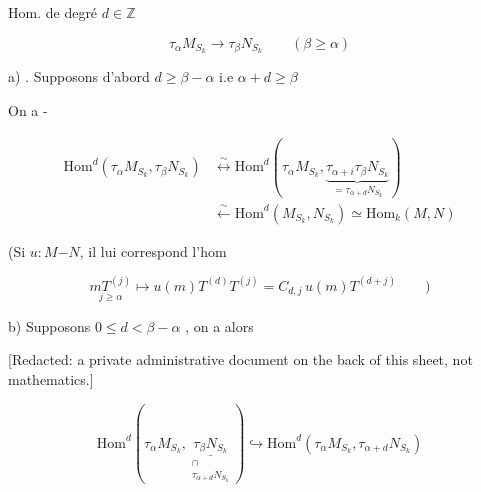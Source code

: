 Hom.  de degré $d\in\mathbb{Z}$

\[
\tau_\alpha M_{S_k}\longrightarrow\tau_\beta N_{S_k}\qquad(\beta\geq\alpha)
\]

a) . Supposons d'abord $\boxed{d\geq\beta-\alpha}$ i.e $\alpha+d\geq\beta$

On a -

\[
\begin{aligned}
\mathrm{Hom}^{d}(\tau_\alpha M_{S_k},\tau_\beta N_{S_k})&\overset{\sim}{\longleftrightarrow}\mathrm{Hom}^{d}(\tau_\alpha M_{S_k},\underbrace{\tau_{\alpha+i}\tau_\beta N_{S_k}}_{=\tau_{\alpha+d}N_{S_k}})\\
&\xleftarrow{\sim}\mathrm{Hom}^{d}(M_{S_k},N_{S_k})\simeq\mathrm{Hom}_k(M,N)
\end{aligned}
\]

(Si $u:M\mathord{-} N$, il lui correspond l'hom

\[
\underset{j\geq\alpha}{mT^{(j)}}\longmapsto u(m)T^{(d)}T^{(j)}=C_{d,j}\,u(m)T^{(d+j)}\qquad\bigg)
\]

b) Supposons $0\leq d<\beta-\alpha$ , on a alors


[Redacted: a private administrative document on the back of this sheet, not mathematics.]


\[
\mathrm{Hom}^{d}(\tau_\alpha M_{S_k},\underset{\substack{\cap\\\tau_{\alpha+d}N_{S_k}}}{\underline{\tau_\beta N_{S_k}}})
\hookrightarrow\mathrm{Hom}^{d}(\tau_\alpha M_{S_k},\tau_{\alpha+d}N_{S_k})
\]


